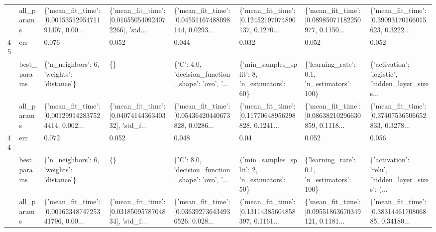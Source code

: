 \begin{tabular}{llllllll}
   & all\_params &  \{'mean\_fit\_time': [0.0015351295471191407, 0.00... &  \{'mean\_fit\_time': [0.016550540924072266], 'std... &  \{'mean\_fit\_time': [0.04551167488098144, 0.0293... &  \{'mean\_fit\_time': [0.12452197074890137, 0.1270... &  \{'mean\_fit\_time': [0.08985071182250977, 0.1150... &  \{'mean\_fit\_time': [0.39093170166015623, 0.3222... \\
45 & err &                                              0.076 &                                              0.052 &                                              0.044 &                                              0.032 &                                              0.052 &                                              0.052 \\
   & best\_params &          \{'n\_neighbors': 6, 'weights': 'distance'\} &                                                 \{\} &  \{'C': 4.0, 'decision\_function\_shape': 'ovo', '... &       \{'min\_samples\_split': 8, 'n\_estimators': 60\} &        \{'learning\_rate': 0.1, 'n\_estimators': 100\} &  \{'activation': 'logistic', 'hidden\_layer\_sizes... \\
   & all\_params &  \{'mean\_fit\_time': [0.001299142837524414, 0.002... &  \{'mean\_fit\_time': [0.0407414436340332], 'std\_f... &  \{'mean\_fit\_time': [0.05436420440673828, 0.0286... &  \{'mean\_fit\_time': [0.11770648956298828, 0.1241... &  \{'mean\_fit\_time': [0.08638210296630859, 0.1118... &  \{'mean\_fit\_time': [0.37407536506652833, 0.3278... \\
44 & err &                                              0.072 &                                              0.052 &                                              0.048 &                                               0.04 &                                              0.052 &                                              0.056 \\
   & best\_params &          \{'n\_neighbors': 6, 'weights': 'distance'\} &                                                 \{\} &  \{'C': 8.0, 'decision\_function\_shape': 'ovo', '... &       \{'min\_samples\_split': 2, 'n\_estimators': 50\} &        \{'learning\_rate': 0.1, 'n\_estimators': 100\} &  \{'activation': 'relu', 'hidden\_layer\_sizes': (... \\
   & all\_params &  \{'mean\_fit\_time': [0.0016234874725341796, 0.00... &  \{'mean\_fit\_time': [0.0318509578704834], 'std\_f... &  \{'mean\_fit\_time': [0.036392736434936526, 0.028... &  \{'mean\_fit\_time': [0.13114385604858397, 0.1161... &  \{'mean\_fit\_time': [0.09551863670349121, 0.1181... &  \{'mean\_fit\_time': [0.3831446170806885, 0.34180... \\

\end{tabular}
